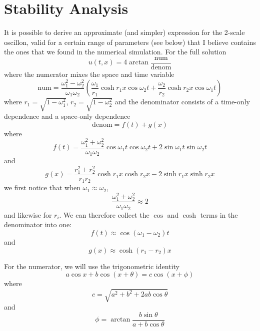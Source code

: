 \documentclass{report}
\begin{document}
\chapter{Stability Analysis}
It is possible to derive an approximate (and simpler) expression for the 2-scale oscillon, valid for a certain range of parameters (see below) that I believe contains the ones that we found in the numerical simulation. For the full solution
\begin{equation}
  u(t,x)=4 \arctan \frac{\textrm{num}}{\textrm{denom}}
\end{equation}
where the numerator mixes the space and time variable
\begin{equation}
  \textrm{num} = \frac{\omega_1^2-\omega_2^2}{\omega_1 \omega_2} \left(\frac{\omega_1}{r_1} \cosh r_1 x \cos\omega_2 t + \frac{\omega_2}{r_2} \cosh r_2 x \cos\omega_1 t \right)
\end{equation}
where $r_1=\sqrt{1-\omega_1^2}$, $r_2=\sqrt{1-\omega_2^2}$ and the denominator consists of a time-only dependence and a space-only dependence
\begin{equation}
    \textrm{denom} = f(t) + g(x)
\end{equation}
where
\begin{equation}
  f(t) = \frac{\omega_1^2+\omega_2^2}{\omega_1 \omega_2} \cos \omega_1 t \cos \omega_2 t +2 \sin \omega_1 t \sin \omega_2 t
\end{equation}
and
\begin{equation}
  g(x) = \frac{r_1^2+r_2^2}{r_1 r_2} \cosh r_1 x \cosh r_2 x-2  \sinh r_1 x \sinh r_2 x
\end{equation}
we first notice that when $\omega_1\approx\omega_2$,
\begin{equation}
  \frac{\omega_1^2+\omega_2^2}{\omega_1 \omega_2} \approx 2
\end{equation}
and likewise for $r_i$. We can therefore collect the $\cos$ and $\cosh$ terms in the denominator into one:
\begin{equation}
  f(t) \approx \cos (\omega_1-\omega_2) t
\end{equation}
and
\begin{equation}
  g(x) \approx \cosh (r_1-r_2) x
\end{equation}

For the numerator, we will use the trigonometric identity
\begin{equation}
  a\cos x + b \cos(x+\theta) = c \cos(x+\phi)
\end{equation}
where
\begin{equation}
  c = \sqrt{a^2+b^2+2ab\cos\theta}
\end{equation}
and
\begin{equation}
  \phi=\arctan \frac{b\sin\theta}{a+b\cos\theta}
\end{equation}
\end{document}
